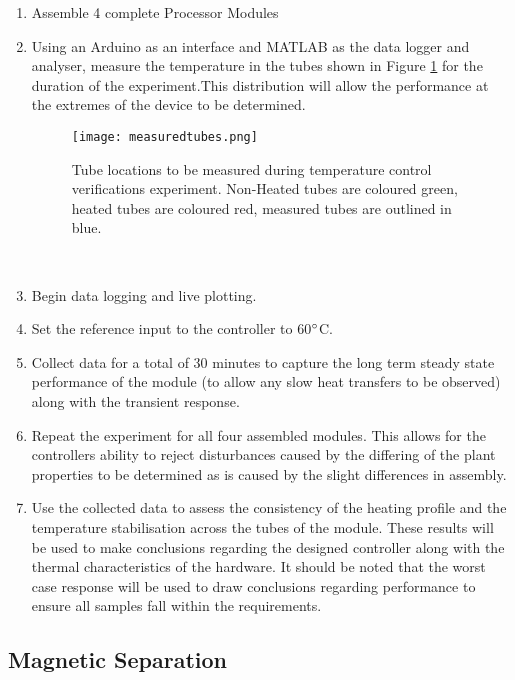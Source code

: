 \begin{enumerate}
	\item Assemble 4 complete Processor Modules
	\item Using an Arduino as an interface and MATLAB as the data logger and analyser, measure the temperature in the tubes shown in Figure \ref{fig:measuredtubes} for the duration of the experiment.This distribution will allow the performance at the extremes of the device to be determined.
	\begin{figure}[!htb]
		\centering
		\texttt{[image: measuredtubes.png]}
		\caption[Temperature Measured Tubes.]{Tube locations to be measured during temperature control verifications experiment. Non-Heated tubes are coloured green, heated tubes are coloured red, measured tubes are outlined in blue.}
		\label{fig:measuredtubes}
	\end{figure} 
	\FloatBarrier
	\item Begin data logging and live plotting.
	\item Set the reference input to the controller to 60$\degree$C.
	\item Collect data for a total of 30 minutes to capture the long term steady state performance of the module (to allow any slow heat transfers to be observed) along with the transient response.
	\item Repeat the experiment for all four assembled modules. This allows for the controllers ability to reject disturbances caused by the differing of the plant properties to be determined as is caused by the slight differences in assembly.
	\item Use the collected data to assess the consistency of the heating profile and the temperature stabilisation across the tubes of the module. These results will be used to make conclusions regarding the designed controller along with the thermal characteristics of the hardware. It should be noted that the worst case response will be used to draw conclusions regarding performance to ensure all samples fall within the requirements.
\end{enumerate}

\subsection{Magnetic Separation}

